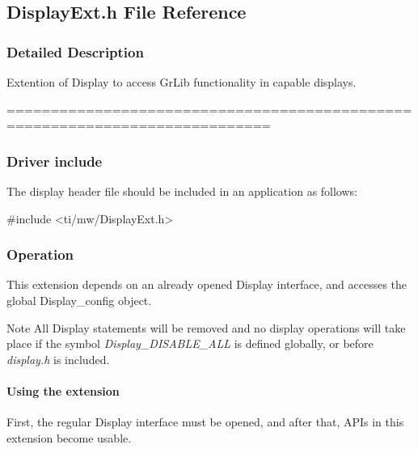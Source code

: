 \subsection{Display\+Ext.\+h File Reference}
\label{_display_ext_8h}


\subsubsection{Detailed Description}
Extention of Display to access Gr\+Lib functionality in capable displays. 

============================================================================

\subsubsection*{Driver include}

The display header file should be included in an application as follows\+: 
\begin{DoxyCode}
\textcolor{preprocessor}{#include <ti/mw/DisplayExt.h>}
\end{DoxyCode}


\subsubsection*{Operation}

This extension depends on an already opened Display interface, and accesses the global Display\+\_\+config object.

\begin{DoxyNote}{Note}
All Display statements will be removed and no display operations will take place if the symbol {\itshape Display\+\_\+\+D\+I\+S\+A\+B\+L\+E\+\_\+\+A\+L\+L} is defined globally, or before {\itshape display.\+h} is included.
\end{DoxyNote}
\paragraph*{Using the extension}

First, the regular Display interface must be opened, and after that, A\+P\+Is in this extension become usable.


